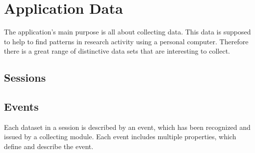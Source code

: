 \chapter{Application Data}
\label{ch:data}

\newenvironment{data}{\newcommand*\spec{\addtocounter{dataid}{10}\item[D\thedataid]}
\begin{itemize}}{\end{itemize}}

The application's main purpose is all about collecting data. This data is supposed to help to find patterns in research activity using a personal computer. Therefore there is a great range of distinctive data sets that are interesting to collect.

\section{Sessions}
\begin{data}




\end{data}

\section{Events}

Each dataset in a session is described by an event, which has been recognized and issued by a collecting module. Each event includes multiple properties, which define and describe the event.

